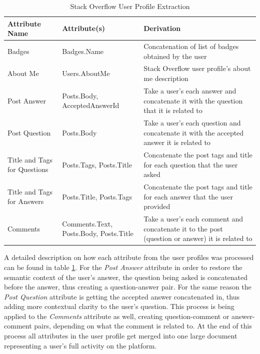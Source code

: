         \begin{table}[!htbp]
            \centering
            \label{tab:SO_userProfileExtraction}
            \caption{Stack Overflow User Profile Extraction}
            \vspace{6pt} %
            \begin{tabular}{|p{3.3cm}|p{2.7cm}|p{8cm}|}
               \toprule
               \textbf{Attribute Name} & \textbf{Attribute(s)} & \textbf{Derivation} \\
               \toprule
                Badges & Badges.Name & Concatenation of list of badges obtained by the user \\
                About Me & Users.AboutMe & Stack Overflow user profile's about me description \\
                Post Answer & Posts.Body, AcceptedAnswerId & Take a user's each answer and concatenate it with the question that it is related to  \\
                Post Question & Posts.Body & Take a user's each question and concatenate it with the accepted answer it is related to  \\
                Title and Tags for Questions & Posts.Tags, Posts.Title & Concatenate the post tags and title for each question that the user asked \\
                Title and Tags for Answers & Posts.Title, Posts.Tags & Concatenate the post tags and title for each answer that the user provided \\
                Comments & Comments.Text, Posts.Body, Posts.Title & Take a user's each comment and concatenate it to the post (question or answer) it is related to \\
               \bottomrule
            \end{tabular}
        \end{table} 
        
        A detailed description on how each attribute from the user profiles was processed can be found in table \ref{tab:SO_userProfileExtraction}. For the \textit{Post Answer} attribute in order to restore the semantic context of the user's answer, the question being asked is concatenated before the answer, thus creating a question-answer pair. For the same reason the \textit{Post Question} attribute is getting the accepted answer concatenated in, thus adding more contextual clarity to the user's question. This process is being applied to the \textit{Comments} attribute as well, creating question-comment or answer-comment pairs, depending on what the comment is related to. At the end of this process all attributes in the user profile get merged into one large document representing a user's full activity on the platform. 
        
